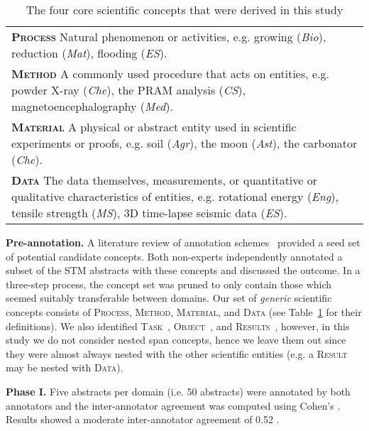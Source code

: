 \documentclass[runningheads]{llncs}
\begin{document}
\begin{table}[htb]
\small
\caption{The four core scientific concepts that were derived in this study}
\begin{tabular}{|p{12cm}|}
\textsc{\textbf{Process}} Natural phenomenon or activities, e.g. growing (\textit{Bio}), reduction (\textit{Mat}), flooding (\textit{ES}).                                          \\
\textsc{\textbf{Method}} A commonly used procedure that acts on entities, e.g. powder X-ray (\textit{Che}), the PRAM analysis (\textit{CS}), magnetoencephalography (\textit{Med}).                                  \\
\textsc{\textbf{Material}} A physical or abstract entity used in scientific experiments or proofs, e.g. soil (\textit{Agr}), the moon (\textit{Ast}), the carbonator (\textit{Che}).                                                   \\
\textsc{\textbf{Data}} The data themselves, measurements, or quantitative or qualitative characteristics of entities, e.g. rotational energy (\textit{Eng}), tensile strength (\textit{MS}), 3D time-lapse seismic data (\textit{ES}).
\end{tabular}
\label{table:0}
\end{table}


\textbf{Pre-annotation.} A literature review of annotation schemes~\cite{Liakata2010CorporaFT,augenstein2017semeval,liakata2012automatic,Constantin2016TheDC} provided a seed set of potential candidate concepts. 
Both non-experts independently annotated a subset of the STM abstracts with these concepts and discussed the outcome. In a three-step process, the concept set was pruned to only contain those which seemed suitably transferable between domains. Our set of \textit{generic} scientific concepts consists of \textsc{Process}, \textsc{Method}, \textsc{Material}, and \textsc{Data} (see Table~\ref{table:0} for their definitions). We also identified \textsc{Task}~\cite{augenstein2017semeval}, \textsc{Object}~\cite{liakata2012automatic}, and \textsc{Results}~\cite{Constantin2016TheDC}, however, in this study we do not consider nested span concepts, hence we leave them out since they were almost always nested with the other scientific entities (e.g. a \textsc{Result} may be nested with \textsc{Data}).


\textbf{Phase I.} Five abstracts per domain (i.e. 50 abstracts) were annotated by both annotators and the inter-annotator agreement was computed using Cohen's  \cite{cohen1960coefficient}.
Results showed a moderate inter-annotator agreement of 0.52 . 
\end{document}
